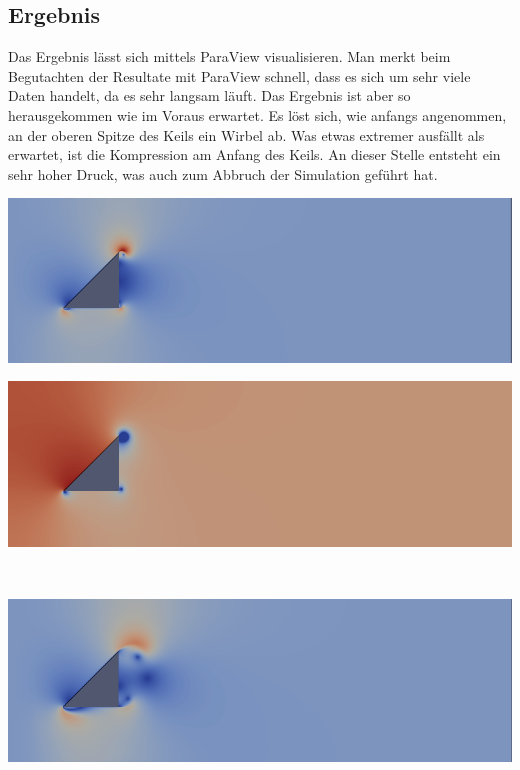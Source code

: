 \begin{refsection}
\subsection{Ergebnis}
Das Ergebnis lässt sich mittels ParaView visualisieren. Man merkt beim Begutachten der Resultate mit ParaView schnell, dass es sich um sehr viele Daten handelt, da es sehr langsam läuft. Das Ergebnis ist aber so herausgekommen wie im Voraus erwartet. Es löst sich, wie anfangs angenommen, an der oberen Spitze des Keils ein Wirbel ab. Was etwas extremer ausfällt als erwartet, ist die Kompression am Anfang des Keils. An dieser Stelle entsteht ein sehr hoher Druck, was auch zum Abbruch der Simulation geführt hat. \\
\begin{minipage}{0.5 \linewidth}
\includegraphics[width = \linewidth]{./OpenFOAM/pics/u1.png}
\end{minipage}
\begin{minipage}{0.5 \linewidth}
\includegraphics[width = \linewidth]{./OpenFOAM/pics/p1.png}
\end{minipage} \\
\begin{minipage}{0.5 \linewidth}
\includegraphics[width = \linewidth]{./OpenFOAM/pics/u5.png}

\end{minipage}
\end{refsection}
